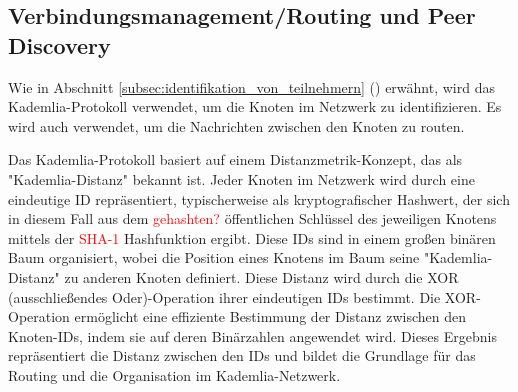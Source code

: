 \subsection{Verbindungsmanagement/Routing und Peer Discovery}
\label{subsec:routing}

Wie in Abschnitt \ref{subsec:identifikation_von_teilnehmern} 
() erwähnt,
wird das Kademlia-Protokoll verwendet, um die Knoten im Netzwerk zu identifizieren.
Es wird auch verwendet, um die Nachrichten zwischen den Knoten zu routen.




Das Kademlia-Protokoll basiert auf einem Distanzmetrik-Konzept, das als \\
"Kademlia-Distanz" bekannt ist. Jeder Knoten im Netzwerk wird durch eine eindeutige 
ID repräsentiert, typischerweise als kryptografischer Hashwert, der sich in diesem Fall 
aus dem \textcolor{red}{gehashten?} öffentlichen Schlüssel
des jeweiligen Knotens mittels der \textcolor{red}{SHA-1} Hashfunktion ergibt. Diese IDs 
sind in einem großen binären Baum organisiert, wobei die Position eines Knotens im Baum seine 
"Kademlia-Distanz" zu anderen Knoten definiert. Diese Distanz wird durch die XOR 
(ausschließendes Oder)-Operation ihrer eindeutigen IDs bestimmt. Die XOR-Operation 
ermöglicht eine effiziente Bestimmung der Distanz zwischen den Knoten-IDs, indem 
sie auf deren Binärzahlen angewendet wird. Dieses Ergebnis repräsentiert die 
Distanz zwischen den IDs und bildet die Grundlage für das Routing und die 
Organisation im Kademlia-Netzwerk.

